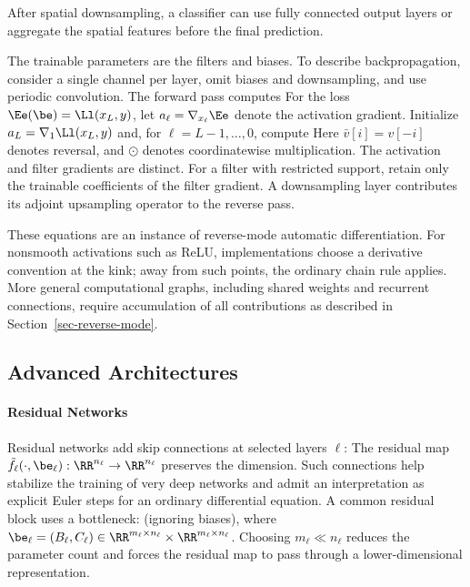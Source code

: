 After spatial downsampling, a classifier can use fully connected output layers or aggregate the spatial features before the final prediction.

The trainable parameters are the filters and biases. To describe backpropagation, consider a single channel per layer, omit biases and downsampling, and use periodic convolution. The forward pass computes
For the loss $\Ee(\be)=\Ll(x_L,y)$, let $a_\ell=\nabla_{x_\ell}\Ee$ denote the activation gradient. Initialize $a_L=\nabla_1\Ll(x_L,y)$ and, for $\ell=L-1,\ldots,0$, compute
Here $\bar v[i]=v[-i]$ denotes reversal, and $\odot$ denotes coordinatewise multiplication. The activation and filter gradients are distinct. For a filter with restricted support, retain only the trainable coefficients of the filter gradient. A downsampling layer contributes its adjoint upsampling operator to the reverse pass.

These equations are an instance of reverse-mode automatic differentiation. For nonsmooth activations such as ReLU, implementations choose a derivative convention at the kink; away from such points, the ordinary chain rule applies. More general computational graphs, including shared weights and recurrent connections, require accumulation of all contributions as described in Section~\ref{sec-reverse-mode}.

\subsection{Advanced Architectures}
\label{sec-advanced}


\paragraph{Residual Networks}

Residual networks add skip connections at selected layers $\ell$:
The residual map $\tilde f_\ell(\cdot,\be_\ell) : \RR^{n_\ell} \rightarrow \RR^{n_\ell}$ preserves the dimension. Such connections help stabilize the training of very deep networks and admit an interpretation as explicit Euler steps for an ordinary differential equation.
%
A common residual block uses a bottleneck:
(ignoring biases), where $\be_\ell = (B_\ell, C_\ell) \in \RR^{m_\ell \times n_\ell} \times \RR^{m_\ell \times n_\ell}$. Choosing $m_\ell \ll n_\ell$ reduces the parameter count and forces the residual map to pass through a lower-dimensional representation.


